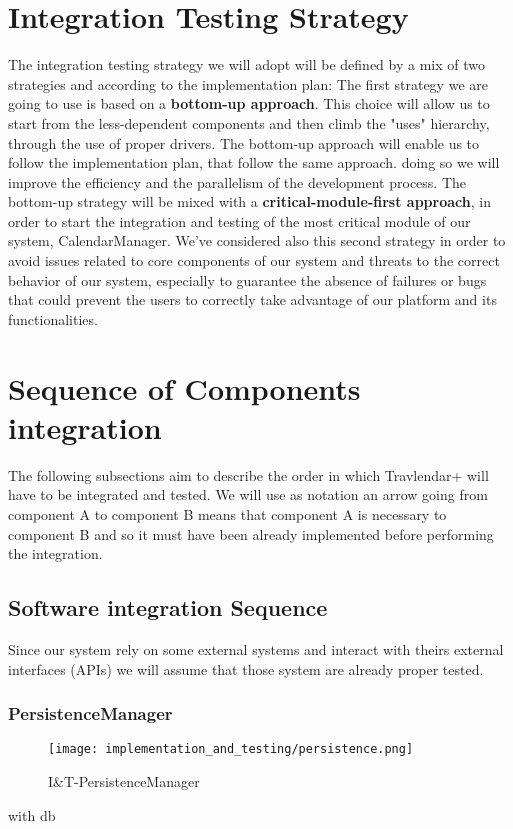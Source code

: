 \section{Integration Testing Strategy}
The integration testing strategy we will adopt will be defined by a mix of two strategies and according to the  implementation plan:
The first strategy we are going to use is based on a \textbf{bottom-up approach}. This choice will allow us to start from the less-dependent components and then climb the "uses" hierarchy, through the use of proper drivers. The bottom-up approach will enable us to follow the implementation plan, that follow the same approach. doing so we will improve the efficiency and the parallelism of the development process. \newline
The bottom-up strategy will be mixed with a \textbf{critical-module-first approach}, in order to start the integration and testing of the most critical module of our system, CalendarManager. We've considered also this second strategy in order to avoid issues related to core components of our system and threats to the correct behavior of our system, especially to guarantee the absence of failures or bugs that could prevent the users to correctly take advantage of our platform and its functionalities.

\section{Sequence of Components integration}
The following subsections aim to describe the order in which Travlendar+ will have to be integrated and tested. We will use as notation an arrow going from component A to component B means that component A is necessary to component B and so it must have been already implemented before performing the integration.

\subsection{Software integration Sequence}
Since our system rely on some external systems and interact with theirs external interfaces (APIs) we will assume that those system are already proper tested.
\subsubsection{PersistenceManager}
\begin{figure}[H]
	\begin{center}
		\texttt{[image: implementation\_and\_testing/persistence.png]}
	\end{center}
	\caption{I\&T-PersistenceManager}
\end{figure}
with db

